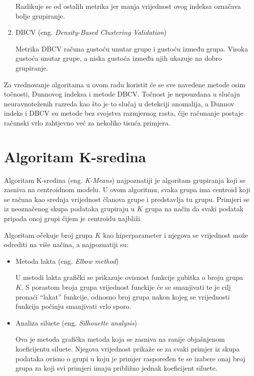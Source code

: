 \documentclass[utf8, diplomski, numeric]{fer}
\begin{document}
\begin{enumerate}
Razlikuje se od ostalih metrika jer manja vrijednost ovog indeksa označava bolje grupiranje.

\item DBCV (eng. \textit{Density-Based Clustering Validation})

Metrika DBCV računa gustoću unutar grupe i gustoću između grupa. Visoka gustoća unutar grupe, a niska gustoća između njih ukazuje na dobro grupiranje.

\end{enumerate}

Za vrednovanje algoritama u ovom radu koristit će se sve navedene metode osim točnosti, Dunnovog indeksa i metode DBCV. Točnost je nepouzdana u slučaju neuravnoteženih razreda kao što je to slučaj u detekciji anomalija, a Dunnov indeks i DBCV su metode bez svojstva razmjernog rasta, čije računanje postaje računski vrlo zahtjevno već za nekoliko tisuća primjera.

\section{Algoritam K-sredina}
Algoritam K-sredina (eng. \textit{K-Means}) najpoznatiji je algoritam grupiranja koji se zasniva na centroidnom modelu. U ovom algoritmu, svaka grupa ima centroid koji se računa kao srednja vrijednost članova grupe i predstavlja tu grupu. Primjeri se iz neoznačenog skupa podataka grupiraju u $K$ grupa na način da svaki podatak pripada onoj grupi čijem je centroidu najbliži. 

Algoritam očekuje broj grupa $K$ kao hiperparameter i njegova se vrijednost može odrediti na više načina, a najpoznatiji su:
\begin{itemize}
\item Metoda lakta (eng. \textit{Elbow method})

U metodi lakta grafički se prikazuje ovisnost funkcije gubitka o broju grupa $K$. S porastom broja grupa vrijednost funckije će se smanjivati te je cilj pronaći ``lakat'' funkcije, odnosno broj grupa nakon kojeg se vrijednosti funkcija počinju smanjivati vrlo sporo.

\item Analiza siluete (eng. \textit{Silhouette analysis})

Ova je metoda grafička metoda koja se zasniva na ranije objašnjenom koeficijentu siluete. Njegova vrijednost prikaže se za svaki primjer iz skupa podataka ovisno o grupi u koju je primjer raspoređen te se izabere onaj broj grupa za koji svi primjeri imaju približno jednak koeficijent siluete.

\end{itemize}
\end{document}
